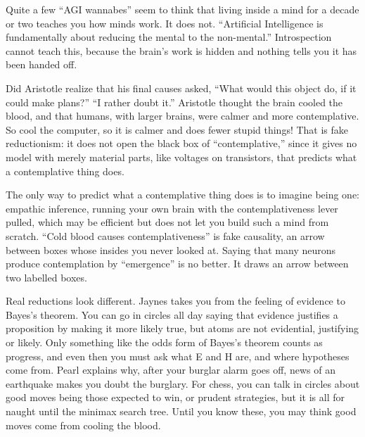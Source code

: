 
Quite a few ``AGI wannabes'' seem to think that living inside a mind for a decade or two teaches you how minds work. It does not. ``Artificial Intelligence is fundamentally about reducing the mental to the non-mental.''  Introspection cannot teach this, because the brain's work is hidden and nothing tells you it has been handed off.

Did Aristotle realize that his final causes asked, ``What would this object do, if it could make plans?'' ``I rather doubt it.''  Aristotle thought the brain cooled the blood, and that humans, with larger brains, were calmer and more contemplative. So cool the computer, so it is calmer and does fewer stupid things! That is fake reductionism: it does not open the black box of ``contemplative,'' since it gives no model with merely material parts, like voltages on transistors, that predicts what a contemplative thing does.

The only way to predict what a contemplative thing does is to imagine being one: empathic inference, running your own brain with the contemplativeness lever pulled, which may be efficient but does not let you build such a mind from scratch. ``Cold blood causes contemplativeness'' is fake causality, an arrow between boxes whose insides you never looked at.  Saying that many neurons produce contemplation by ``emergence'' is no better. It draws an arrow between two labelled boxes.

Real reductions look different. Jaynes takes you from the feeling of evidence to Bayes's theorem. You can go in circles all day saying that evidence justifies a proposition by making it more likely true, but atoms are not evidential, justifying or likely. Only something like the odds form of Bayes's theorem counts as progress, and even then you must ask what E and H are, and where hypotheses come from. Pearl explains why, after your burglar alarm goes off, news of an earthquake makes you doubt the burglary.  For chess, you can talk in circles about good moves being those expected to win, or prudent strategies, but it is all for naught until the minimax search tree. Until you know these, you may think good moves come from cooling the blood.

